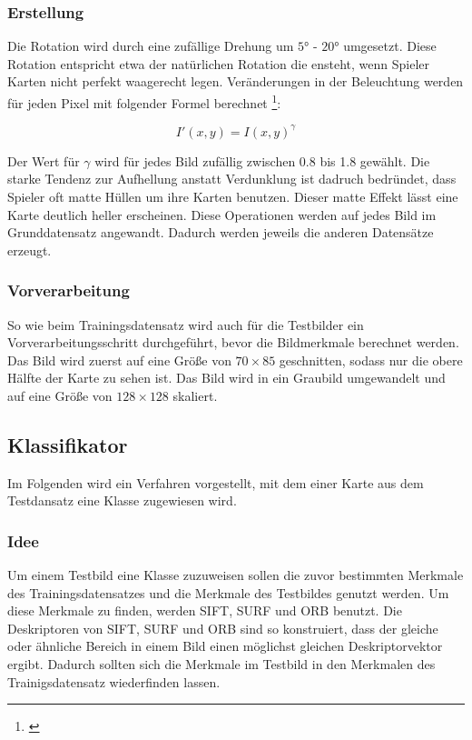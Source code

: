\subsubsection{Erstellung}

Die Rotation wird durch eine zufällige Drehung um $5°$ - $20°$ umgesetzt. Diese Rotation entspricht etwa der natürlichen Rotation die ensteht, wenn Spieler Karten nicht perfekt waagerecht legen.
Veränderungen in der Beleuchtung werden für jeden Pixel mit folgender Formel berechnet \footnote{\cite[S. 75]{Burg06}}:

\[
I'(x, y) = I(x, y)^\gamma
\]

Der Wert für $\gamma$ wird für jedes Bild zufällig zwischen 0.8 bis 1.8 gewählt. Die starke Tendenz zur Aufhellung anstatt Verdunklung ist dadruch bedründet, dass Spieler oft matte Hüllen um ihre Karten benutzen. Dieser matte Effekt lässt eine Karte deutlich heller erscheinen.
Diese Operationen werden auf jedes Bild im Grunddatensatz angewandt. Dadurch werden jeweils die anderen Datensätze erzeugt.

\subsubsection{Vorverarbeitung}

So wie beim Trainingsdatensatz wird auch für die Testbilder ein Vorverarbeitungsschritt durchgeführt, bevor die Bildmerkmale berechnet werden.
Das Bild wird zuerst auf eine Größe von $70 \times 85$ geschnitten, sodass nur die obere Hälfte der Karte zu sehen ist.
Das Bild wird in ein Graubild umgewandelt und auf eine Größe von $128 \times 128$ skaliert.

\subsection{Klassifikator}
\label{sec:klassifikator}

Im Folgenden wird ein Verfahren vorgestellt, mit dem einer Karte aus dem Testdansatz eine Klasse zugewiesen wird. 

\subsubsection{Idee}

Um einem Testbild eine Klasse zuzuweisen sollen die zuvor bestimmten Merkmale des Trainingsdatensatzes und die Merkmale des Testbildes genutzt werden.
Um diese Merkmale zu finden, werden SIFT, SURF und ORB benutzt.
Die Deskriptoren von SIFT, SURF und ORB sind so konstruiert, dass der gleiche oder ähnliche Bereich in einem Bild einen möglichst gleichen Deskriptorvektor ergibt. 
Dadurch sollten sich die Merkmale im Testbild in den Merkmalen des Trainigsdatensatz wiederfinden lassen.

